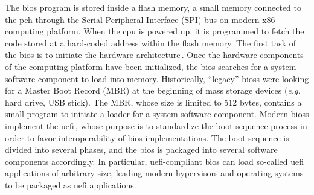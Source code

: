 The \ac{bios} program is stored inside a flash memory, a small memory connected
to the \ac{pch} through the Serial Peripheral Interface (SPI) bus on modern x86
computing platform.
%
When the \ac{cpu} is powered up, it is programmed to fetch the code stored at a
hard-coded address within the flash memory.
%
The first task of the \ac{bios} is to initiate the hardware
architecture\,\cite{salihun2006bios}.
%
Once the hardware components of the computing platform have been initialized,
the \ac{bios} searches for a system software component to load into memory.
%
Historically, ``legacy'' \acp{bios} were looking for a Master Boot Record (MBR)
at the beginning of mass storage devices (\emph{e.g.} hard drive, USB stick).
%
The MBR, whose size is limited to 512 bytes, contains a small program to
initiate a loader for a system software component.
%
Modern \acp{bios} implement the \ac{uefi}\,\cite{zimmer2007uefi,uefi2017specs},
whose purpose is to standardize the boot sequence process in order to favor
interoperability of \ac{bios} implementations.
%
The boot sequence is divided into several phases, and the \ac{bios} is packaged
into several software components accordingly.
%
In particular, \ac{uefi}-compliant \ac{bios} can load so-called \ac{uefi}
applications of arbitrary size, leading modern hypervisors and operating systems
to be packaged as \ac{uefi} applications.

